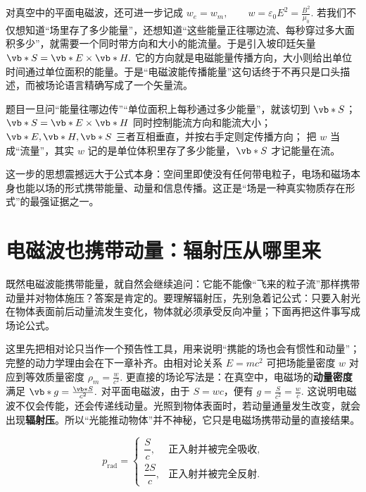 \documentclass[lang=cn,11pt]{elegantbook}
\begin{document}
对真空中的平面电磁波，还可进一步记成
 \(w_e=w_m,\qquad w=\varepsilon_0E^2=\frac{B^2}{\mu_0}.\) 
若我们不仅想知道“场里存了多少能量”，还想知道“这些能量正往哪边流、每秒穿过多大面积多少”，就需要一个同时带方向和大小的能流量。于是引入坡印廷矢量
 \(\vb*{S}=\vb*{E}\times \vb*{H}.\) 
它的方向就是电磁能量传播方向，大小则给出单位时间通过单位面积的能量。于是“电磁波能传播能量”这句话终于不再只是口头描述，而被场论语言精确写成了一个矢量流。

\begin{note}
 题目一旦问“能量往哪边传”“单位面积上每秒通过多少能量”，就该切到 \(\vb*{S}\)； \(\vb*{S}=\vb*{E}\times\vb*{H}\) 同时控制能流方向和能流大小； \(\vb*{E},\vb*{H},\vb*{S}\) 三者互相垂直，并按右手定则定传播方向； 把 \(w\) 当成“流量”，其实 \(w\) 记的是单位体积里存了多少能量，\(\vb*{S}\) 才记能量在流。
\end{note}

\begin{remark}
这一步的思想震撼远大于公式本身：空间里即使没有任何带电粒子，电场和磁场本身也能以场的形式携带能量、动量和信息传播。这正是“场是一种真实物质存在形式”的最强证据之一。
\end{remark}

\section{电磁波也携带动量：辐射压从哪里来}

既然电磁波能携带能量，就自然会继续追问：它能不能像“飞来的粒子流”那样携带动量并对物体施压？答案是肯定的。要理解辐射压，先别急着记公式：只要入射光在物体表面前后动量流发生变化，物体就必须承受反向冲量；下面再把这件事写成场论公式。

这里先把相对论只当作一个预告性工具，用来说明“携能的场也会有惯性和动量”；完整的动力学理由会在下一章补齐。由相对论关系 \(E=mc^2\) 可把场能量密度 \(w\) 对应到等效质量密度
 \(\rho_m=\frac{w}{c^2}.\) 
更直接的场论写法是：在真空中，电磁场的\textbf{动量密度}满足
 \(\vb*{g}=\frac{\vb*{S}}{c^2}.\) 
对平面电磁波，由于 \(S=wc\)，便有
 \(g=\frac{S}{c^2}=\frac{w}{c}.\) 
这说明电磁波不仅会传能，还会传递线动量。光照到物体表面时，若动量通量发生改变，就会出现\textbf{辐射压}。所以“光能推动物体”并不神秘，它只是电磁场携带动量的直接结果。

\[
p_{\mathrm{rad}}=
\begin{cases}
\dfrac{S}{c}, & \text{正入射并被完全吸收},\\[6pt]
\dfrac{2S}{c}, & \text{正入射并被完全反射}.
\end{cases}
\]
\end{document}
